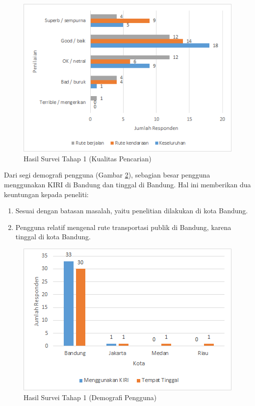 \begin{figure}
	\centering
	\includegraphics[scale=0.75]{Gambar/5_hasilsurvei_1_1}
	\caption{Hasil Survei Tahap 1 (Kualitas Pencarian)} 
	\label{fig:5_hasilsurvei_1_1}
\end{figure}

Dari segi demografi pengguna (Gambar \ref{fig:5_hasilsurvei_1_2}), sebagian besar pengguna menggunakan KIRI di Bandung dan tinggal di Bandung. Hal ini memberikan dua keuntungan kepada peneliti:

\begin{enumerate}
	\item Sesuai dengan batasan masalah, yaitu penelitian dilakukan di kota Bandung.
	\item Pengguna relatif mengenal rute transportasi publik di Bandung, karena tinggal di kota Bandung.
\end{enumerate}

\begin{figure}
	\centering
	\includegraphics[scale=0.75]{Gambar/5_hasilsurvei_1_2}
	\caption{Hasil Survei Tahap 1 (Demografi Pengguna)} 
	\label{fig:5_hasilsurvei_1_2}
\end{figure}

